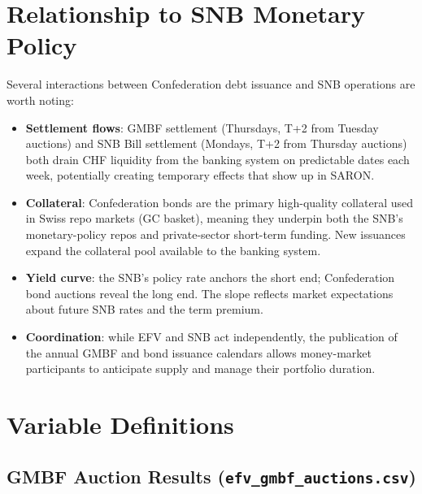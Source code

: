 \documentclass[12pt,a4paper]{article}
\begin{document}
\section{Relationship to SNB Monetary Policy}

Several interactions between Confederation debt issuance and SNB operations
are worth noting:

\begin{itemize}[leftmargin=1.5em, itemsep=2pt]
  \item \textbf{Settlement flows}: GMBF settlement (Thursdays, T+2 from
    Tuesday auctions) and SNB Bill settlement (Mondays, T+2 from Thursday
    auctions) both drain CHF liquidity from the banking system on predictable
    dates each week, potentially creating temporary effects that show up in
    SARON.
  \item \textbf{Collateral}: Confederation bonds are the primary high-quality
    collateral used in Swiss repo markets (GC basket), meaning they
    underpin both the SNB's monetary-policy repos and private-sector
    short-term funding.  New issuances expand the collateral pool available
    to the banking system.
  \item \textbf{Yield curve}: the SNB's policy rate anchors the short end;
    Confederation bond auctions reveal the long end.  The slope reflects
    market expectations about future SNB rates and the term premium.
  \item \textbf{Coordination}: while EFV and SNB act independently, the
    publication of the annual GMBF and bond issuance calendars allows
    money-market participants to anticipate supply and manage their
    portfolio duration.
\end{itemize}

\section{Variable Definitions}

\subsection{GMBF Auction Results (\texttt{efv\_gmbf\_auctions.csv})}
\end{document}
